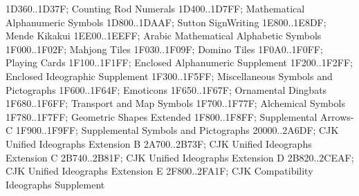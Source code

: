 1D360..1D37F; Counting Rod Numerals
1D400..1D7FF; Mathematical Alphanumeric Symbols
1D800..1DAAF; Sutton SignWriting
1E800..1E8DF; Mende Kikakui
1EE00..1EEFF; Arabic Mathematical Alphabetic Symbols
1F000..1F02F; Mahjong Tiles
1F030..1F09F; Domino Tiles
1F0A0..1F0FF; Playing Cards
1F100..1F1FF; Enclosed Alphanumeric Supplement
1F200..1F2FF; Enclosed Ideographic Supplement
1F300..1F5FF; Miscellaneous Symbols and Pictographs
1F600..1F64F; Emoticons
1F650..1F67F; Ornamental Dingbats
1F680..1F6FF; Transport and Map Symbols
1F700..1F77F; Alchemical Symbols
1F780..1F7FF; Geometric Shapes Extended
1F800..1F8FF; Supplemental Arrows-C
1F900..1F9FF; Supplemental Symbols and Pictographs
20000..2A6DF; CJK Unified Ideographs Extension B
2A700..2B73F; CJK Unified Ideographs Extension C
2B740..2B81F; CJK Unified Ideographs Extension D
2B820..2CEAF; CJK Unified Ideographs Extension E
2F800..2FA1F; CJK Compatibility Ideographs Supplement
